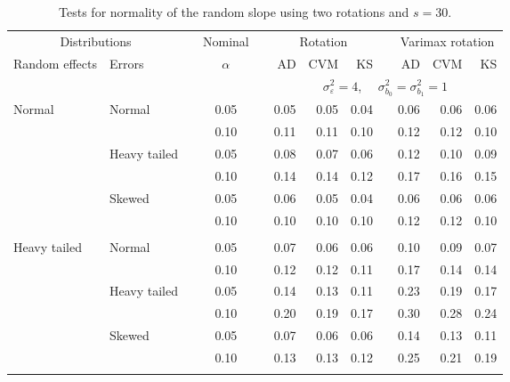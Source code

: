 \begin{table}[ht]
\caption{\label{tab:simb130}Tests for normality of the random slope using two rotations and $s = 30$.}
\begin{scriptsize}
\begin{center}
\begin{tabular}{ll p{.1cm} c p{.1cm} rrr p{.1cm} rrr}
  \hline
  \multicolumn{2}{c}{Distributions}& & Nominal & &  \multicolumn{3}{c}{Rotation} & & \multicolumn{3}{c}{Varimax rotation} \\ \cline{1-2} \cline{6-8} \cline{10-12}   
  Random effects & Errors & & $\alpha$ & & AD & CVM & KS & & AD & CVM & KS \\ 
   \hline
& && && \multicolumn{7}{c}{$\sigma_{\varepsilon}^2 = 4$, \ \ $\sigma_{b_0}^2 = \sigma_{b_1}^2 = 1$} \\ \cline{6-12}
\rowcolor{gray!20}Normal       & Normal       && 0.05 &&  0.05 & 0.05 & 0.04 && 0.06 & 0.06 & 0.06 \\ 
\rowcolor{gray!20}             &              && 0.10 &&  0.11 & 0.11 & 0.10 && 0.12 & 0.12 & 0.10 \\ 
\rowcolor{gray!20}             & Heavy tailed && 0.05 &&  0.08 & 0.07 & 0.06 && 0.12 & 0.10 & 0.09 \\ 
\rowcolor{gray!20}             &              && 0.10 &&  0.14 & 0.14 & 0.12 && 0.17 & 0.16 & 0.15 \\ 
\rowcolor{gray!20}             & Skewed       && 0.05 &&  0.06 & 0.05 & 0.04 && 0.06 & 0.06 & 0.06 \\ 
\rowcolor{gray!20}             &              && 0.10 &&  0.10 & 0.10 & 0.10 && 0.12 & 0.12 & 0.10 \\ 
             &&&&&&&&&&&\\
Heavy tailed & Normal       && 0.05 &&  0.07 & 0.06 & 0.06 && 0.10 & 0.09 & 0.07 \\ 
             &              && 0.10 &&  0.12 & 0.12 & 0.11 && 0.17 & 0.14 & 0.14 \\ 
             & Heavy tailed && 0.05 &&  0.14 & 0.13 & 0.11 && 0.23 & 0.19 & 0.17 \\ 
             &              && 0.10 &&  0.20 & 0.19 & 0.17 && 0.30 & 0.28 & 0.24 \\ 
             & Skewed       && 0.05 &&  0.07 & 0.06 & 0.06 && 0.14 & 0.13 & 0.11 \\ 
             &              && 0.10 &&  0.13 & 0.13 & 0.12 && 0.25 & 0.21 & 0.19 \\ 
             &&&&&&&&&&&\\

\end{tabular}
\end{center}
\end{scriptsize}
\end{table}
